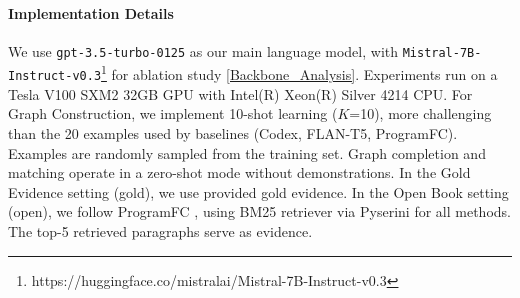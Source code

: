 \paragraph{Implementation Details}
We use \texttt{gpt-3.5-turbo-0125} as our main language model, with \texttt{Mistral-7B-Instruct-v0.3}\footnote{https://huggingface.co/mistralai/Mistral-7B-Instruct-v0.3} for ablation study \ref{Backbone_Analysis}. Experiments run on a Tesla V100 SXM2 32GB GPU with Intel(R) Xeon(R) Silver 4214 CPU.
For Graph Construction, we implement 10-shot learning ($K$=10), more challenging than the 20 examples used by baselines (Codex, FLAN-T5, ProgramFC). Examples are randomly sampled from the training set. Graph completion and matching operate in a zero-shot mode without demonstrations.
In the Gold Evidence setting (gold), we use provided gold evidence. In the Open Book setting (open), we follow ProgramFC \cite{pan2023fact}, using BM25 \cite{robertson2009probabilistic} retriever via Pyserini \cite{lin2021pyserini} for all methods. The top-5 retrieved paragraphs serve as evidence.

